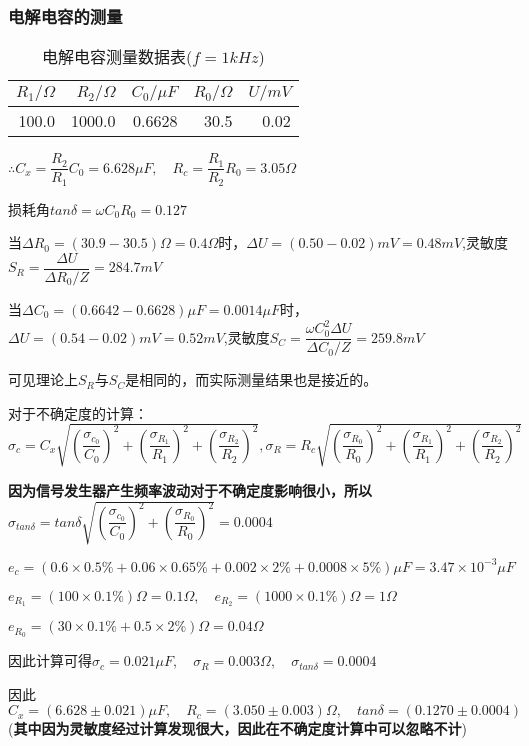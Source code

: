 \documentclass[UTF8]{ctexart}
\begin{document}
	\subsubsection{电解电容的测量}
	\begin{table}[H]
		\centering
		\caption{电解电容测量数据表($f=1kHz$)}
		\label{电解电容测量数据表}
		\begin{tabular}{|r|r|r|r|r|}
			\toprule[0.5mm]
			$R_{1}/\Omega$&$R_{2}/\Omega$&$C_{0}/\mu F$&$R_{0}/\Omega$&$U/mV$\\
			\midrule
			100.0&1000.0&0.6628&30.5&0.02\\
			\bottomrule[0.5mm]
		\end{tabular}
	\end{table}
	$\therefore C_{x}=\dfrac{R_{2}}{R_{1}}C_{0}=6.628\mu F,\quad R_{c}=\dfrac{R_{1}}{R_{2}}R_{0}=3.05\Omega$
	\par 损耗角$tan\delta=\omega C_{0}R_{0}=0.127$
	\par 当$\Delta R_{0}=(30.9-30.5)\Omega=0.4\Omega$时，$\Delta U=(0.50-0.02)mV=0.48mV$,灵敏度$S_{R}=\dfrac{\Delta U}{\Delta R_{0}/Z}=284.7mV$
	\par 当$\Delta C_{0}=(0.6642-0.6628)\mu F=0.0014\mu F$时，$\Delta U=(0.54-0.02)mV=0.52mV$,灵敏度$S_{C}=\dfrac{\omega C_{0}^{2}\Delta U}{\Delta C_{0}/Z}=259.8mV$
	\par 可见理论上$S_{R}$与$S_{C}$是相同的，而实际测量结果也是接近的。
	\par 对于不确定度的计算：$\sigma_{c}=C_{x}\sqrt{(\dfrac{\sigma_{c_{0}}}{C_{0}})^{2}+(\dfrac{\sigma_{R_{1}}}{R_{1}})^{2}+(\dfrac{\sigma_{R_{2}}}{R_{2}})^{2}},\sigma_{R}=R_{c}\sqrt{(\dfrac{\sigma_{R_{0}}}{R_{0}})^{2}+(\dfrac{\sigma_{R_{1}}}{R_{1}})^{2}+(\dfrac{\sigma_{R_{2}}}{R_{2}})^{2}}$
	\par \textbf{因为信号发生器产生频率波动对于不确定度影响很小，所以}$\sigma_{tan\delta}=tan\delta\sqrt{(\dfrac{\sigma_{c_{0}}}{C_{0}})^{2}+(\dfrac{\sigma_{R_{0}}}{R_{0}})^{2}}=0.0004$
	\par $e_{c}=(0.6\times 0.5\%+0.06\times0.65\%+0.002\times2\%+0.0008\times5\%)\mu F=3.47\times10^{-3}\mu F$
	\par $e_{R_{1}}=(100\times0.1\%)\Omega=0.1\Omega,\quad e_{R_{2}}=(1000\times0.1\%)\Omega=1\Omega$
	\par $e_{R_{0}}=(30\times 0.1\%+0.5\times 2\%)\Omega=0.04\Omega$
	\par 因此计算可得$\sigma_{c}=0.021\mu F,\quad\sigma_{R}=0.003\Omega,\quad \sigma_{tan\delta}=0.0004$
	\par 因此$C_{x}=(6.628\pm 0.021)\mu F,\quad R_{c}=(3.050\pm 0.003)\Omega,\quad tan\delta=(0.1270\pm 0.0004)$(\textbf{其中因为灵敏度经过计算发现很大，因此在不确定度计算中可以忽略不计})
\end{document}
